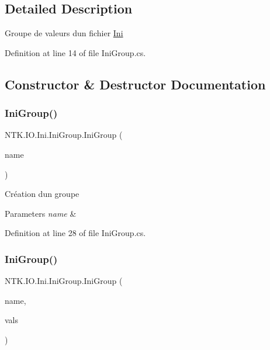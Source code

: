 \subsection{Detailed Description}
Groupe de valeurs d\textquotesingle{}un fichier \mbox{\hyperlink{namespace_n_t_k_1_1_i_o_1_1_ini}{Ini}} 



Definition at line 14 of file Ini\+Group.\+cs.



\subsection{Constructor \& Destructor Documentation}
\mbox{\label{class_n_t_k_1_1_i_o_1_1_ini_1_1_ini_group_a3e8d8a73cfa85640fd9328d0fe0fd5fd}} 
\subsubsection{\texorpdfstring{IniGroup()}{IniGroup()}\hspace{0.1cm}{\footnotesize\ttfamily [1/4]}}
{\footnotesize\ttfamily N\+T\+K.\+I\+O.\+Ini.\+Ini\+Group.\+Ini\+Group (\begin{DoxyParamCaption}\item[{String}]{name }\end{DoxyParamCaption})}



Création d\textquotesingle{}un groupe 


\begin{DoxyParams}{Parameters}
{\em name} & \\
\hline
\end{DoxyParams}


Definition at line 28 of file Ini\+Group.\+cs.

\mbox{\label{class_n_t_k_1_1_i_o_1_1_ini_1_1_ini_group_ac5d8a9a976821f1eedf7b54deaf17c37}} 
\subsubsection{\texorpdfstring{IniGroup()}{IniGroup()}\hspace{0.1cm}{\footnotesize\ttfamily [2/4]}}
{\footnotesize\ttfamily N\+T\+K.\+I\+O.\+Ini.\+Ini\+Group.\+Ini\+Group (\begin{DoxyParamCaption}\item[{String}]{name,  }\item[{params \mbox{\hyperlink{class_n_t_k_1_1_i_o_1_1_ini_1_1_ini_value}{Ini\+Value}} \mbox{[}$\,$\mbox{]}}]{vals }\end{DoxyParamCaption})}



